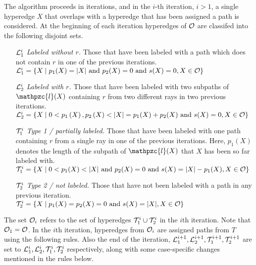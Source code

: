 \documentclass[11pt,
               envcountsect,
               envcountsame]
               {../lib/llncs2e/llncs}
\def\cL{{\cal L}}
\def\cO{{\cal O}}
\def\cT{{\cal T}}
\def\cl{\mathpzc{l}}
\def\xnoindent{\noindent} %
\newcommand{\set}[1]{\left\{ #1\right\}}
\begin{document}
 \xnoindent The algorithm proceeds in iterations, and in the $i$-th
 iteration, $i > 1$, a single hyperedge $X$ that overlaps with a
 hyperedge that has been assigned a path is considered.  At the
 beginning of each iteration hyperedges of $\cO$ are classifed into
 the following disjoint sets.
 \begin{enumerate}
 \item [$\cL_1^i$] {\em Labeled without $r$.} Those that have been
   labeled with a path which does not contain $r$ in one of the
   previous iterations.\\  $\cL_1^i = \set{ X \mid p_1(X) = |X| \text{ and
     } p_2(X) = 0 \text{ and } s(X) = 0, X \in \cO}$
 \item [$\cL_2^i$] {\em Labeled with $r$.} Those that have been labeled
   with two subpaths of $\cl(X)$ containing $r$ from two different rays
   in two previous iterations.\\ $\cL_2^i = \set{X \mid 0 < p_1\left(X\right),
     p_2\left(X\right) < |X|=p_1(X)+p_2(X) \text{ and } s(X) = 0, X \in \cO}$
   \item [$\cT_1^i$] {\em Type 1 / partially labeled.} Those that have
     been labeled with one path containing $r$ from a single ray in one
     of the previous iterations. Here, $p_1(X)$ denotes the length of
     the subpath of $\cl(X)$ that $X$ has been so far labeled
     with. \\
     $\cT_1^i = \set{ X \mid 0 < p_1(X) < |X| \text{ and } p_2(X) = 0
       \text{ and } s(X) = |X|-p_1(X), X \in \cO}$
   \item [$\cT_2^i$] {\em Type 2 / not labeled.} Those that have not been
     labeled with a path in any previous iteration.\\
     $\cT_2^i = \set{ X \mid p_1(X) = p_2(X) = 0 \text{ and } s(X) = |X|,
       X \in \cO}$
 \end{enumerate}

\noindent
The set $\cO_i$ refers to the set of hyperedges $\cT_1^i \cup \cT_2^i$
in the $i$th iteration.  Note that $\cO_1 = \cO$.  In the $i$th
iteration, hyperedges from $\cO_i$ are assigned paths from $T$ using
the following rules. Also the end of the iteration, $\cL_1^{i+1},
\cL_2^{i+1}, \cT_1^{i+1}, \cT_2^{i+1}$ are set to $\cL_1^{i},
\cL_2^{i}, \cT_1^{i}, \cT_2^{i}$ respectively, along with some
case-specific changes mentioned in the rules below.
\end{document}
